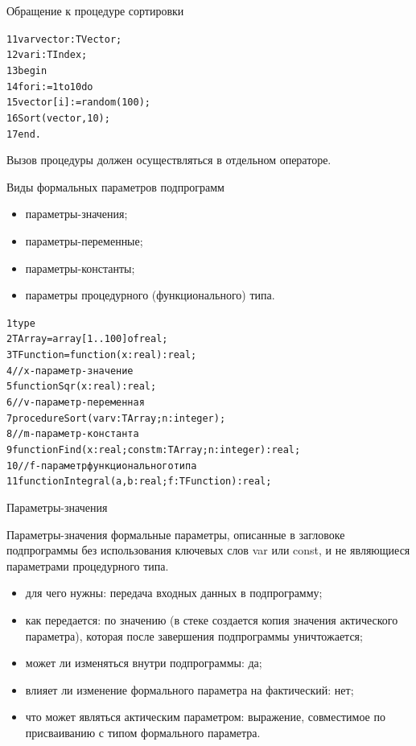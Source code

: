 \documentclass{beamer}
\begin{document}
\begin{frame}[fragile]{Обращение к процедуре сортировки}
\begin{alltt}
11 var vector: TVector; 
12 var i: TIndex; 
13 begin
14   for i := 1 to 10 do
15      vector[i] := random(100);
16   Sort(vector, 10);
17 end.
\end{alltt}
Вызов процедуры должен осуществляться в отдельном операторе.
\end{frame}

\begin{frame}[fragile]{Виды формальных параметров подпрограмм}
\begin{itemize}
\item параметры-значения;
\item параметры-переменные;
\item параметры-константы;
\item параметры процедурного (функционального) типа.
\end{itemize}
\begin{alltt}
1 type
2   TArray = array[1..100] of real;
3   TFunction = function(x: real):real; 
4  //x - параметр-значение
5 function Sqr(x: real): real;
6  //v - параметр-переменная
7 procedure Sort(var v: TArray; n: integer);
8  //m - параметр-константа
9 function Find(x: real; const m: TArray; n: integer): real;
10 //f - параметр функционального типа
11 function Integral(a, b: real; f: TFunction): real;
\end{alltt}
\end{frame}

\begin{frame}[fragile]{Параметры-значения}
\begin{block}{Параметры-значения }
формальные параметры, описанные в загловоке подпрограммы без использования ключевых слов var или const, и не являющиеся параметрами процедурного типа.
\end{block}
\begin{itemize}
\item для чего нужны: передача входных данных в подпрограмму;
\item как передается: по значению (в стеке создается копия значения актического параметра), которая после завершения подпрограммы уничтожается;
\item может ли изменяться внутри подпрограммы: да;
\item влияет ли изменение формального параметра на фактический: нет;
\item что может являться актическим параметром: выражение, совместимое по присваиванию с типом формального параметра.
\end{itemize}
\end{frame}
\end{document}
